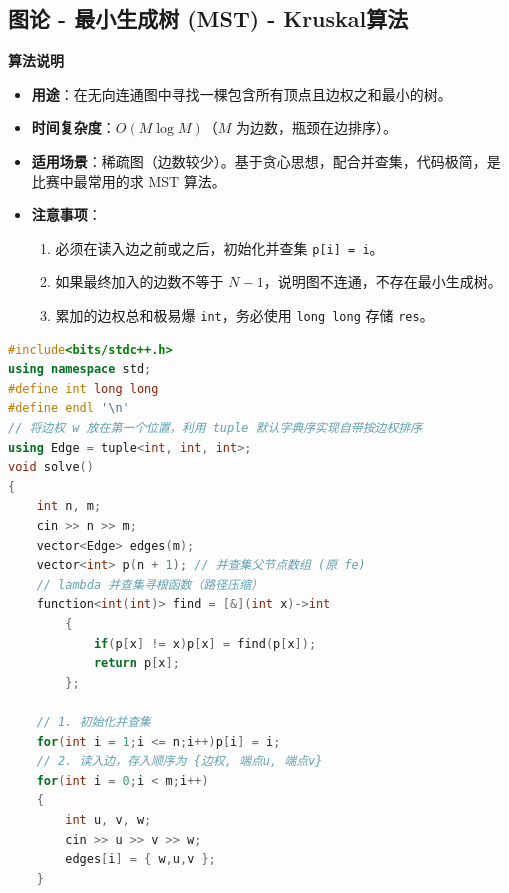 \documentclass[10pt,landscape,a4paper]{article}
\begin{document}
\begin{multicols*}{3}
\subsection*{图论 - 最小生成树 (MST) - Kruskal算法}
\par\addvspace{0.7ex}\noindent\textbf{算法说明}\par\nobreak
\begin{itemize}
\item \textbf{用途}：在无向连通图中寻找一棵包含所有顶点且边权之和最小的树。
\item \textbf{时间复杂度}：$O(M \log M)$（$M$ 为边数，瓶颈在边排序）。
\item \textbf{适用场景}：稀疏图（边数较少）。基于贪心思想，配合并查集，代码极简，是比赛中最常用的求 MST 算法。
\item \textbf{注意事项}：
\begin{enumerate}[start=1]
\item 必须在读入边之前或之后，初始化并查集 \texttt{p\allowbreak{}[\allowbreak{}i\allowbreak{}]\allowbreak{} \allowbreak{}=\allowbreak{} \allowbreak{}i}。
\item 如果最终加入的边数不等于 $N-1$，说明图不连通，不存在最小生成树。
\item 累加的边权总和极易爆 \texttt{i\allowbreak{}n\allowbreak{}t}，务必使用 \texttt{l\allowbreak{}o\allowbreak{}n\allowbreak{}g\allowbreak{} \allowbreak{}l\allowbreak{}o\allowbreak{}n\allowbreak{}g} 存储 \texttt{r\allowbreak{}e\allowbreak{}s}。
\end{enumerate}
\end{itemize}
\par{}\par
\begin{lstlisting}[language=C++]
#include<bits/stdc++.h>
using namespace std;
#define int long long
#define endl '\n'
// 将边权 w 放在第一个位置，利用 tuple 默认字典序实现自带按边权排序
using Edge = tuple<int, int, int>;
void solve()
{
    int n, m;
    cin >> n >> m;
    vector<Edge> edges(m);
    vector<int> p(n + 1); // 并查集父节点数组 (原 fe)
    // lambda 并查集寻根函数（路径压缩）
    function<int(int)> find = [&](int x)->int
        {
            if(p[x] != x)p[x] = find(p[x]);
            return p[x];
        };

    // 1. 初始化并查集
    for(int i = 1;i <= n;i++)p[i] = i;
    // 2. 读入边，存入顺序为 {边权, 端点u, 端点v}
    for(int i = 0;i < m;i++)
    {
        int u, v, w;
        cin >> u >> v >> w;
        edges[i] = { w,u,v };
    }


\end{lstlisting}
\end{multicols*}
\end{document}
